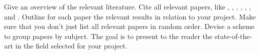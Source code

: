 \documentclass[11pt]{article}       %
\begin{document}
Give an overview of the relevant literature. Cite all relevant
papers, like \cite{DEL07}, \cite{PD07}, \cite{DER07}, \cite{LDR07},
\cite{DLX06}, \cite{CDE06}, and \cite{DFL06}. Outline for each paper
the relevant results in relation to your project. Make sure that you
don't just list all relevant papers in random order. Devise a scheme
to group papers by subject. The goal is to present to the reader the
state-of-the-art in the field selected for your project.




\end{document}
